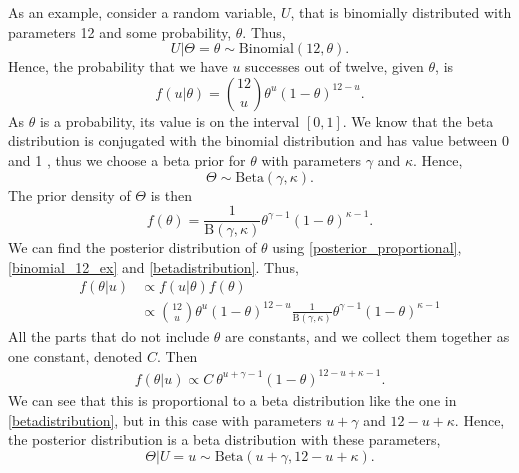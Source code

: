 As an example, consider a random variable, $U$, that is binomially distributed with parameters 12 and some probability, $\theta$. Thus,
\begin{equation*}
    U|\Theta=\theta \sim \mathrm{Binomial}(12,\theta).
\end{equation*}
Hence, the probability that we have $u$ successes out of twelve, given $\theta$, is
\begin{equation}
\label{binomial_12_ex}
    f(u|\theta) = \binom{12}{u} \theta^{u} (1-\theta)^{12-u}.
\end{equation}
As $\theta$ is a probability, its value is on the interval $[0,1]$. We know that the beta distribution is conjugated with the binomial distribution and has value between 0 and 1 \citep{statinf}, thus we choose a beta prior for $\theta$ with parameters $\gamma$ and $\kappa$. Hence,
\begin{equation*}
    \Theta \sim \mathrm{Beta}(\gamma,\kappa). 
\end{equation*}
The prior density of $\Theta$ is then
\begin{equation}
    \label{betadistribution}
    f(\theta) = \frac{1}{\mathrm{B}(\gamma,\kappa)}\theta^{\gamma-1}(1-\theta)^{\kappa-1}.
\end{equation}
We can find the posterior distribution of $\theta$ using \eqref{posterior_proportional}, \eqref{binomial_12_ex} and \eqref{betadistribution}. Thus,
\begin{equation*}
    \begin{aligned}
        f(\theta|u) 
        &\propto f(u|\theta)f(\theta)\\[6pt]
        &\propto \binom{12}{u} \theta^{u} (1-\theta)^{12-u} \frac{1}{\mathrm{B}(\gamma,\kappa)}\theta^{\gamma-1}(1-\theta)^{\kappa-1}
    \end{aligned}
\end{equation*}
All the parts that do not include $\theta$ are constants, and we collect them together as one constant, denoted $C$. Then
\begin{equation*}
    \begin{aligned}
        f(\theta|u) 
        \propto C \: \theta^{u+\gamma-1}(1-\theta)^{12-u+\kappa-1}.
    \end{aligned}
\end{equation*}
We can see that this is proportional to a beta distribution like the one in \eqref{betadistribution}, but in this case with parameters $u+\gamma$ and $12-u+\kappa$. Hence, the posterior distribution is a beta distribution with these parameters, 
\begin{equation*}
    \Theta|U=u \sim \mathrm{Beta}(u+\gamma,12-u+\kappa).
\end{equation*}







